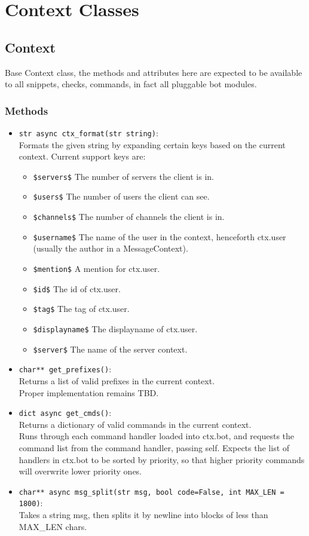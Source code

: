 \documentclass[a4paper]{amsart}
\begin{document}
\section{Context Classes}
\subsection{Context}
Base Context class, the methods and attributes here are expected to be available to all snippets, checks, commands, in fact all pluggable bot modules.
\subsubsection{Methods}
\begin{itemize}
    \item \verb|str async ctx_format(str string)|:\\
        Formats the given string by expanding certain keys based on the current context. Current support keys are:
        \begin{itemize}
            \item \verb|$servers$| The number of servers the client is in.
            \item \verb|$users$| The number of users the client can see.
            \item \verb|$channels$| The number of channels the client is in.
            \item \verb|$username$| The name of the user in the context, henceforth ctx.user (usually the author in a MessageContext).
            \item \verb|$mention$| A mention for ctx.user.
            \item \verb|$id$| The id of ctx.user.
            \item \verb|$tag$| The tag of ctx.user.
            \item \verb|$displayname$| The displayname of ctx.user.
            \item \verb|$server$| The name of the server context.
        \end{itemize}
    \item \verb|char** get_prefixes()|:\\
        Returns a list of valid prefixes in the current context. \\
        Proper implementation remains TBD.
    \item \verb|dict async get_cmds()|:\\
        Returns a dictionary of valid commands in the current context.\\
        Runs through each command handler loaded into ctx.bot, and requests the command list from the command handler, passing {self}.
        Expects the list of handlers in ctx.bot to be sorted by priority, so that higher priority commands will overwrite lower priority ones.
    \item \verb|char** async msg_split(str msg, bool code=False, int MAX_LEN = 1800)|:\\
        Takes a string {msg}, then splits it by newline into blocks of less than {MAX\_LEN} chars.

\end{itemize}
\end{document}
